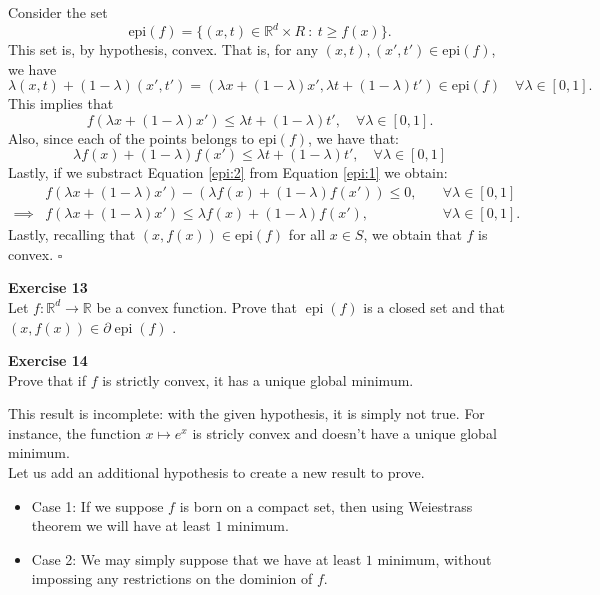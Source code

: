 \documentclass[11pt,table]{article}
\newcommand{\qed}{\hfill $\square$}
\newenvironment{problem}[2][Exercise]
{ \begin{mdframed}[backgroundcolor=gray!20] \textbf{#1 #2} \\}
	{  \end{mdframed}}
\newcommand\R{\mathbb R}
\begin{document}
	Consider the set
	\[
	\text{epi}(f) = \{(x,t)\in \R^d \times R \ : \ t \geq f(x)\}.
	\]
	This set is, by hypothesis, convex. That is, for any \((x,t),(x',t') \in \text{epi}(f)\), we have
	\[
	\lambda(x,t) + (1-\lambda)(x',t')  = \left(\lambda x + (1-\lambda)x', \lambda t + (1-\lambda)t'\right) \in \text{epi}(f)\quad \forall \lambda \in [0,1].
	\]
	This implies that
	\begin{equation}\label{epi:1}
		f(\lambda x + (1-\lambda)x') \leq \lambda t + (1-\lambda)t', \quad \forall \lambda \in [0,1].
	\end{equation}
	Also, since each of the points belongs to \(\text{epi}(f)\), we have that:
	\begin{equation}\label{epi:2}
		\lambda f(x) + (1-\lambda)f(x') \leq \lambda t + (1-\lambda)t', \quad \forall \lambda \in [0,1]
	\end{equation}
	Lastly, if we substract Equation \eqref{epi:2} from Equation \eqref{epi:1} we obtain:
	\begin{align*}
		& f(\lambda x + (1-\lambda)x')  - \left( \lambda f(x) + (1-\lambda)f(x')\right)  \leq 0, & \quad \forall \lambda \in [0,1]
		\\ \implies & f(\lambda x + (1-\lambda)x') \leq  \lambda f(x) + (1-\lambda)f(x'), &\quad \forall \lambda \in [0,1].
	\end{align*}
	Lastly, recalling that \((x,f(x)) \in \text{epi}(f)\) for all \(x \in S\), we obtain that \(f\) is convex. \qed \\
	
	
	\begin{problem}{13}
		Let \( f : \mathbb{R}^d \to \mathbb{R} \) be a convex function. Prove that \( \operatorname{epi}(f) \) is a closed set and that \( (x, f(x)) \in \partial \operatorname{epi}(f) \)  .
	\end{problem}
	
	
	
	\begin{problem}{14}
		Prove that if \( f \)  is strictly convex, it has a unique global minimum.
	\end{problem}
	
	This result is incomplete: with the given hypothesis, it is simply not true. For instance, the function $x \mapsto e^x$ is stricly convex and doesn't have a unique global minimum. \\
	
	Let us add an additional hypothesis to create a new result to prove.
	
	\begin{itemize}
		\item Case 1: If we suppose $f$ is born on a compact set, then using Weiestrass theorem we will have at least $1$ minimum.
		\item Case 2: We may simply suppose that we have at least $1$ minimum, without impossing any restrictions on the dominion of $f$.
	\end{itemize}
	
\end{document}
